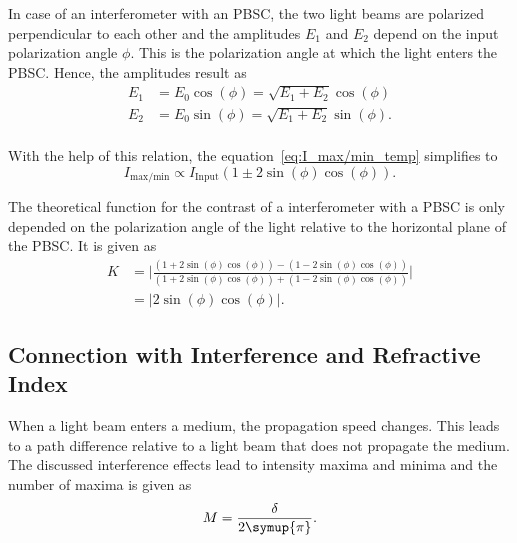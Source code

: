 In case of an interferometer with an PBSC, the two light beams are polarized perpendicular to each other and the amplitudes $E_1$ and $E_2$ depend on the input polarization angle $\phi$. This
is the polarization angle at which the light enters the PBSC.
Hence, the amplitudes result as
\begin{align*}
    E_1 &= E_0\cos(\phi) = \sqrt{E_1+E_2}\cos(\phi) \\
    E_2 &= E_0\sin(\phi) = \sqrt{E_1+E_2}\sin(\phi). \\
\end{align*}

With the help of this relation, the equation~\eqref{eq:I_max/min_temp} simplifies to
\begin{equation}
    I_{\text{max/min}} \propto I_{\text{Input}}(1 \pm 2\sin(\phi)\cos(\phi)).
    \label{eq:I_max/min}
\end{equation}

The theoretical function for the contrast of a interferometer with a PBSC is only depended on the polarization angle of the light relative to the horizontal plane of
the PBSC. It is given as
\begin{align}
    K &= \bigg|\frac{(1 + 2\sin(\phi)\cos(\phi)) - (1 - 2\sin(\phi)\cos(\phi))}{(1 + 2\sin(\phi)\cos(\phi)) + (1 - 2\sin(\phi)\cos(\phi))}\bigg| \\
      &= |2\sin(\phi)\cos(\phi)|.
      \label{eq:contrast_theo_func}
\end{align}

\subsection{Connection with Interference and Refractive Index}
\label{sec:Connection_Interference_n}
When a light beam enters a medium, the propagation speed changes. This leads to a path difference relative to a light beam that does not propagate the medium.
The discussed interference effects lead to intensity maxima and minima and the number of maxima is given as
\begin{equation}
    M = \frac{\delta}{2\symup{\pi}}.
    \label{eq:M}
\end{equation}


